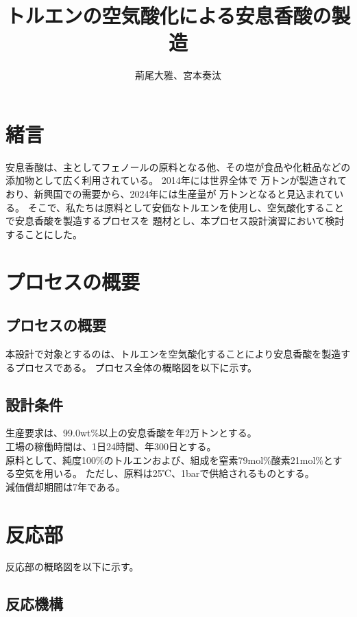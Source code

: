 \documentclass[a4j]{jsreport}
\begin{document}
\title{トルエンの空気酸化による安息香酸の製造}
\author{荊尾大雅、宮本奏汰}
\maketitle

\newpage

\setcounter{tocdepth}{2}
\tableofcontents
    
\newpage

\chapter{緒言}
安息香酸は、主としてフェノールの原料となる他、その塩が食品や化粧品などの添加物として広く利用されている。
2014年には世界全体で 万トンが製造されており、新興国での需要から、2024年には生産量が 万トンとなると見込まれている。
そこで、私たちは原料として安価なトルエンを使用し、空気酸化することで安息香酸を製造するプロセスを
題材とし、本プロセス設計演習において検討することにした。

\newpage
\chapter{プロセスの概要}
\section{プロセスの概要}
本設計で対象とするのは、トルエンを空気酸化することにより安息香酸を製造するプロセスである。
プロセス全体の概略図を以下に示す。

\section{設計条件}
生産要求は、99.0wt\%以上の安息香酸を年2万トンとする。\\
工場の稼働時間は、1日24時間、年300日とする。\\
原料として、純度100\%のトルエンおよび、組成を窒素79mol\%酸素21mol\%とする空気を用いる。
ただし、原料は25℃、1barで供給されるものとする。\\
減価償却期間は7年である。

\newpage
\chapter{反応部}
反応部の概略図を以下に示す。

\section{反応機構}
\end{document}
